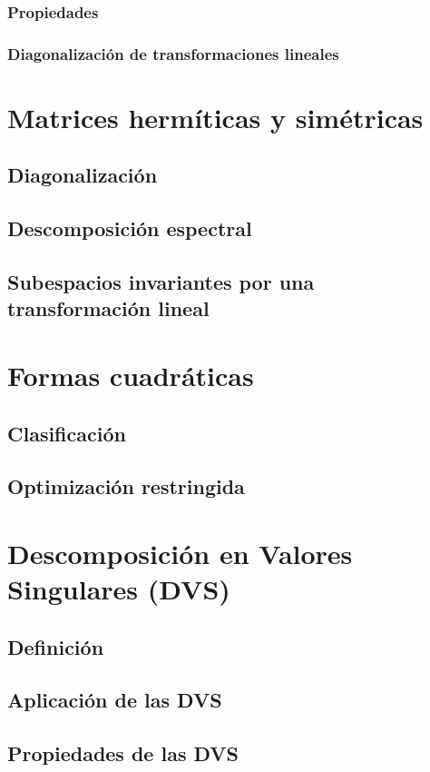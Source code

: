 \documentclass[oneside]{article}
\numberwithin{equation}{section}
\numberwithin{figure}{section}
\numberwithin{table}{section}
\begin{document}
					\subsubsection{Propiedades}
					\subsubsection{Diagonalización de transformaciones lineales}
			\section{Matrices hermíticas y simétricas}
				\subsection{Diagonalización}
				\subsection{Descomposición espectral}
				\subsection{Subespacios invariantes por una transformación lineal}
			\section{Formas cuadráticas}
				\subsection{Clasificación}
				\subsection{Optimización restringida}
			\section{Descomposición en Valores Singulares (DVS)}
				\subsection{Definición}
				\subsection{Aplicación de las DVS}
				\subsection{Propiedades de las DVS}
\end{document}
